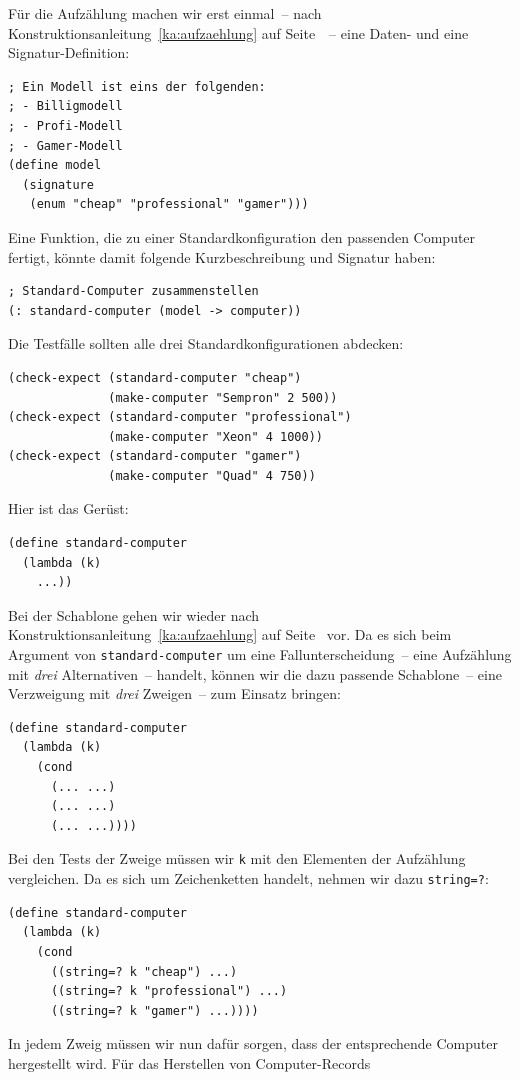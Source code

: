 Für die Aufzählung machen wir erst einmal~-- nach
Konstruktionsanleitung~\ref{ka:aufzaehlung} auf
Seite~\pageref{ka:aufzaehlung}~-- eine Daten- und eine
Signatur-Definition:
%
\begin{lstlisting}
; Ein Modell ist eins der folgenden:
; - Billigmodell
; - Profi-Modell
; - Gamer-Modell
(define model
  (signature
   (enum "cheap" "professional" "gamer")))
\end{lstlisting}
%
Eine Funktion, die zu einer Standardkonfiguration den passenden
Computer fertigt, könnte damit folgende Kurzbeschreibung und Signatur haben:
%
\begin{lstlisting}
; Standard-Computer zusammenstellen
(: standard-computer (model -> computer))
\end{lstlisting}
%
Die Testfälle sollten alle drei Standardkonfigurationen abdecken:
%
\begin{lstlisting}
(check-expect (standard-computer "cheap")
              (make-computer "Sempron" 2 500))
(check-expect (standard-computer "professional")
              (make-computer "Xeon" 4 1000))
(check-expect (standard-computer "gamer")
              (make-computer "Quad" 4 750))
\end{lstlisting}
%
Hier ist das Gerüst:
%
\begin{lstlisting}
(define standard-computer
  (lambda (k)
    ...))
\end{lstlisting}
%
Bei der Schablone gehen wir wieder nach Konstruktionsanleitung~\ref{ka:aufzaehlung} auf
Seite~\pageref{ka:aufzaehlung} vor.
Da es sich beim Argument von \lstinline{standard-computer} um eine Fallunterscheidung~-- eine Aufzählung
mit \emph{drei} Alternativen~-- handelt, können wir die
dazu passende Schablone~-- eine Verzweigung mit \emph{drei} Zweigen~--
zum Einsatz bringen:
%
\begin{lstlisting}
(define standard-computer
  (lambda (k)
    (cond
      (... ...)
      (... ...)
      (... ...))))
\end{lstlisting}
%
Bei den Tests der Zweige müssen wir \lstinline{k} mit den Elementen der
Aufzählung vergleichen.  Da es sich um Zeichenketten handelt, nehmen
wir dazu \lstinline{string=?}:
%
\begin{lstlisting}
(define standard-computer
  (lambda (k)
    (cond
      ((string=? k "cheap") ...)
      ((string=? k "professional") ...)
      ((string=? k "gamer") ...))))
\end{lstlisting}
%
In jedem Zweig müssen wir nun dafür sorgen, dass der entsprechende
Computer hergestellt wird.  Für das Herstellen von Computer-Records
